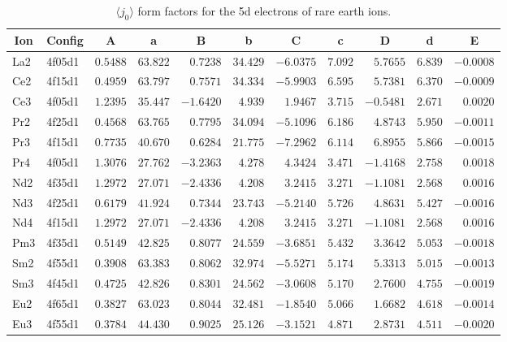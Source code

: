 \begin{table}[H]
 \caption{$\langle j_0\rangle$ form factors for the 5d electrons of rare earth ions.\cite{kob:12}}
 \vspace{1ex}
 \label{re5dj0}
{\tablesize
\begin{tabular}{llrrrrrrrrr}
\hline
\multicolumn{1}{c}{ Ion}&\multicolumn{1}{c}{ Config}&\multicolumn{1}{c}{ A }&\multicolumn{1}{c}{  a }&\multicolumn{1}{c}{B }&\multicolumn{1}{c}{ b }&\multicolumn{1}{c}{ C }&\multicolumn{1}{c}{ c }&\multicolumn{1}{c}{ D }&\multicolumn{1}{c}{ d }&\multicolumn{1}{c}{E}\\
\hline
La2 & 4f05d1 &$0.5488$ &$63.822$ &$0.7238$ &$34.429$ &$-6.0375$ &$7.092$ &$5.7655$ &$6.839$ &$-0.0008$ \\
Ce2 & 4f15d1 &$0.4959$ &$63.797$ &$0.7571$ &$34.334$ &$-5.9903$ &$6.595$ &$5.7381$ &$6.370$ &$-0.0009$ \\
Ce3 & 4f05d1 &$1.2395$ &$35.447$ &$-1.6420$ &$4.939$ &$1.9467$ &$3.715$ &$-0.5481$ &$2.671$ &$0.0020$ \\
Pr2 & 4f25d1 &$0.4568$ &$63.765$ &$0.7795$ &$34.094$ &$-5.1096$ &$6.186$ &$4.8743$ &$5.950$ &$-0.0011$ \\
Pr3 & 4f15d1 &$0.7735$ &$40.670$ &$0.6284$ &$21.775$ &$-7.2962$ &$6.114$ &$6.8955$ &$5.866$ &$-0.0015$ \\
Pr4 & 4f05d1 &$1.3076$ &$27.762$ &$-3.2363$ &$4.278$ &$4.3424$ &$3.471$ &$-1.4168$ &$2.758$ &$0.0018$ \\
Nd2 & 4f35d1 &$1.2972$ &$27.071$ &$-2.4336$ &$4.208$ &$3.2415$ &$3.271$ &$-1.1081$ &$2.568$ &$0.0016$ \\
Nd3 & 4f25d1 &$0.6179$ &$41.924$ &$0.7344$ &$23.743$ &$-5.2140$ &$5.726$ &$4.8631$ &$5.427$ &$-0.0016$ \\
Nd4 & 4f15d1 &$1.2972$ &$27.071$ &$-2.4336$ &$4.208$ &$3.2415$ &$3.271$ &$-1.1081$ &$2.568$ &$0.0016$ \\
Pm3 & 4f35d1 &$0.5149$ &$42.825$ &$0.8077$ &$24.559$ &$-3.6851$ &$5.432$ &$3.3642$ &$5.053$ &$-0.0018$ \\
Sm2 & 4f55d1 &$0.3908$ &$63.383$ &$0.8062$ &$32.974$ &$-5.5271$ &$5.174$ &$5.3313$ &$5.015$ &$-0.0013$ \\
Sm3 & 4f45d1 &$0.4725$ &$42.826$ &$0.8301$ &$24.562$ &$-3.0608$ &$5.170$ &$2.7600$ &$4.755$ &$-0.0019$ \\
Eu2 & 4f65d1 &$0.3827$ &$63.023$ &$0.8044$ &$32.481$ &$-1.8540$ &$5.066$ &$1.6682$ &$4.618$ &$-0.0014$ \\
Eu3 & 4f55d1 &$0.3784$ &$44.430$ &$0.9025$ &$25.126$ &$-3.1521$ &$4.871$ &$2.8731$ &$4.511$ &$-0.0020$ \\

\end{tabular}}
\end{table}
